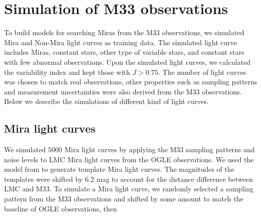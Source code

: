 \section{Simulation of M33 observations} \label{sec.simulation}







To build models for searching Miras from the M33 observations, we simulated Mira and Non-Mira light curves as training data. The simulated light curve includes Miras, constant stars, other type of variable stars, and constant stars with few abnormal observations. Upon the simulated light curves, we calculated the variability index and kept those with $J>0.75$. The number of light curves was chosen to match real observations, other properties such as sampling patterns and measurement uncertainties were also derived from the M33 observations. Below we describe the simulations of different kind of light curves.

\subsection{Mira light curves}
We simulated 5000 Mira light curves by applying the M33 sampling patterns and noise levels to LMC Mira light curves from the OGLE observations. We used the model from  to generate template Mira light curves. The magnitudes of the templates were shifted by 6.2 mag to account for the distance difference between LMC and M33. To simulate a Mira light curve, we randomly selected a sampling pattern from the M33 observations and shifted by some amount to match the baseline of OGLE observations, then 